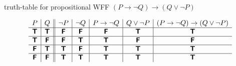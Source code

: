 \documentclass[11pt,leqno,fleqn]{article}
\begin{document}
\newcommand{\TTT}{\bm{\mathsf{T}}}
\newcommand{\FFF}{\bm{\mathsf{F}}}

truth-table for propositional WFF 
$(P\to\neg{Q})\to (Q\lor\neg{P})$

\[
\begin{array}{ c | c || c | c | c | c | c }
 P & Q & \neg{P} & \neg{Q} 
    & P\to\neg{Q} & Q\lor\neg{P} & (P\to\neg{Q})\to (Q\lor\neg{P})
\\ \hline 
 \TTT & \TTT & \FFF & \FFF & \FFF & \TTT & \TTT 
\\ \hline  
 \TTT & \FFF & \FFF & \TTT & \TTT & \FFF & \FFF    
\\ \hline  
 \FFF & \TTT & \TTT & \FFF & \TTT & \TTT & \TTT    
\\ \hline  
 \FFF & \FFF & \TTT & \TTT & \TTT & \TTT & \TTT    
\end{array}
\]
\end{document}

